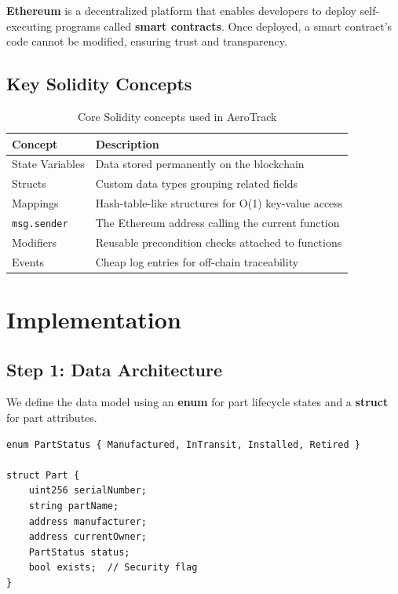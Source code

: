 \documentclass[12pt,a4paper]{article}
\begin{document}
\textbf{Ethereum} is a decentralized platform that enables developers to deploy self-executing programs called \textbf{smart contracts}. Once deployed, a smart contract's code cannot be modified, ensuring trust and transparency.

\subsection{Key Solidity Concepts}

\begin{table}[H]
\centering
\begin{tabularx}{\textwidth}{lX}
\toprule
\textbf{Concept} & \textbf{Description} \\
\midrule
State Variables & Data stored permanently on the blockchain \\
Structs & Custom data types grouping related fields \\
Mappings & Hash-table-like structures for O(1) key-value access \\
\texttt{msg.sender} & The Ethereum address calling the current function \\
Modifiers & Reusable precondition checks attached to functions \\
Events & Cheap log entries for off-chain traceability \\
\bottomrule
\end{tabularx}
\caption{Core Solidity concepts used in AeroTrack}
\end{table}

\section{Implementation}

\subsection{Step 1: Data Architecture}

We define the data model using an \textbf{enum} for part lifecycle states and a \textbf{struct} for part attributes.

\begin{lstlisting}[caption={Part status enum and struct definition}]
enum PartStatus { Manufactured, InTransit, Installed, Retired }

struct Part {
    uint256 serialNumber;
    string partName;
    address manufacturer;
    address currentOwner;
    PartStatus status;
    bool exists;  // Security flag
}
\end{lstlisting}
\end{document}
